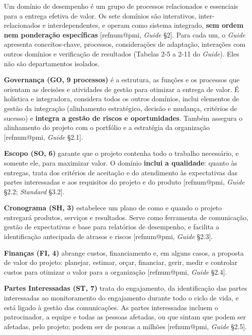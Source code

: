 \documentclass[11pt,a4paper]{article}
\makeatletter
\newcommand{\refnum}[1]{\csname refnum@#1\endcsname}
\makeatother
\begin{document}
Um domínio de desempenho é um grupo de processos relacionados e essenciais para a entrega efetiva de valor. Os sete domínios são interativos, inter-relacionados e interdependentes, e operam como sistema integrado, \textbf{sem ordem nem ponderação específicas} [\refnum{pmi}, \textit{Guide} §2]. Para cada um, o \textit{Guide} apresenta conceitos-chave, processos, considerações de adaptação, interações com outros domínios e verificação de resultados (Tabelas 2-5 a 2-11 do \textit{Guide}). Eles não são departamentos isolados.

\textbf{Governança (GO, 9 processos)} é a estrutura, as funções e os processos que orientam as decisões e atividades de gestão para otimizar a entrega de valor. É holística e integradora, considera todos os outros domínios, inclui elementos de gestão da integração (alinhamento estratégico, decisão e mudança, critérios de sucesso) e \textbf{integra a gestão de riscos e oportunidades}. Também assegura o alinhamento do projeto com o portfólio e a estratégia da organização [\refnum{pmi}, \textit{Guide} §2.1].

\textbf{Escopo (SO, 6)} garante que o projeto contenha todo o trabalho necessário, e somente ele, para maximizar valor. O domínio \textbf{inclui a qualidade}: quanto às entregas, trata dos critérios de aceitação e do atendimento às expectativas das partes interessadas e aos requisitos do projeto e do produto [\refnum{pmi}, \textit{Guide} §2.2; \textit{Standard} §3.2].

\textbf{Cronograma (SH, 3)} estabelece um plano de como e quando o projeto entregará produtos, serviços e resultados. Serve como ferramenta de comunicação, gestão de expectativas e base para relatórios de desempenho, e facilita a identificação antecipada de atrasos e riscos [\refnum{pmi}, \textit{Guide} §2.3].

\textbf{Finanças (FI, 4)} abrange custos, financiamento e, em alguns casos, a proposta de valor do projeto: planejar, estimar, orçar, financiar, gerir, medir e controlar custos para otimizar o valor para a organização [\refnum{pmi}, \textit{Guide} §2.4].

\textbf{Partes Interessadas (ST, 7)} trata do engajamento, da identificação das partes interessadas ao monitoramento do engajamento durante todo o ciclo de vida, e está ligado à gestão das comunicações. As partes interessadas incluem o patrocinador, a equipe e todas as pessoas afetadas, ou que sintam que podem ser afetadas, pelo projeto; podem ser de poucas a milhões [\refnum{pmi}, \textit{Guide} §2.5].
\end{document}
